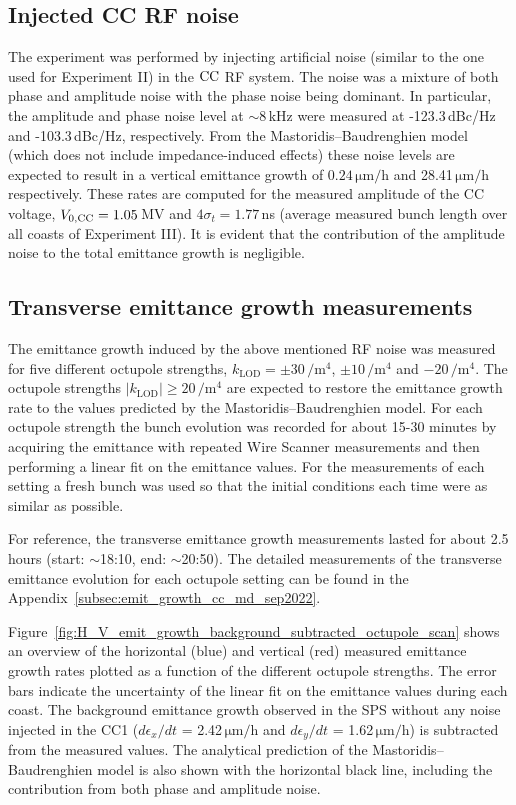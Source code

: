 \subsection{Injected CC RF noise}\label{subsec:cc_rf_noise_exp3}
The experiment was performed by injecting artificial noise (similar to the one used for Experiment II) in the ${\mathrm{CC}}$ RF system. The noise was a mixture of both phase and amplitude noise with the phase noise being dominant. In particular, the amplitude and phase noise level at $\sim$8\,kHz were measured at -123.3\,dBc/Hz and -103.3\,dBc/Hz, respectively. From the Mastoridis--Baudrenghien model (which does not include impedance-induced effects) these noise levels are expected to result in a vertical emittance growth of $0.24$\,$\mathrm{\mu m/h}$ and 28.41\,$\mathrm{\mu m/h}$ respectively. These rates are computed for the measured amplitude of the CC voltage, ${V_\mathrm{0, CC}}=1.05$\,MV and $4\sigma_t=1.77$\,ns (average measured bunch length over all coasts of Experiment III). It is evident that the contribution of the amplitude noise to the total emittance growth is negligible. %


\subsection{Transverse emittance growth measurements}\label{subsec:cc_rf_noise_emit_growth_exp3}
The emittance growth induced by the above mentioned RF noise was measured for five different octupole strengths, $k_\mathrm{LOD}=\pm 30$\,$\mathrm{/m^4}$, $ \pm 10$\,$\mathrm{/m^4}$ and $-20$\,$\mathrm{/m^4}$. The octupole strengths $| k_\mathrm{LOD} | \geq 20$\,$\mathrm{/m^4}$ are expected to restore the emittance growth rate to the values predicted by the Mastoridis--Baudrenghien model. For each octupole strength the bunch evolution was recorded for about 15-30 minutes by acquiring the emittance with repeated Wire Scanner measurements and then performing a linear fit on the emittance values. For the measurements of each setting a fresh bunch was used so that the initial conditions each time were as similar as possible.

For reference, the transverse emittance growth measurements lasted for about 2.5\,hours (start: $\sim$18:10, end: $\sim$20:50). The detailed measurements of the transverse emittance evolution for each octupole setting can be found in the Appendix~\ref{subsec:emit_growth_cc_md_sep2022}. 

Figure~\ref{fig:H_V_emit_growth_background_subtracted_octupole_scan} shows an overview of the horizontal (blue) and vertical (red) measured emittance growth rates plotted as a function of the different octupole strengths. The error bars indicate the uncertainty of the linear fit on the emittance values during each coast. The background emittance growth observed in the SPS without any noise injected in the CC1 ($d\epsilon_x/dt$ = 2.42\,$\mathrm{\mu m/h}$ and $d\epsilon_y/dt$ = 1.62\,$\mathrm{\mu m/h}$) is subtracted from the measured values. The analytical prediction of the Mastoridis--Baudrenghien model is also shown with the horizontal black line, including the contribution from both phase and amplitude noise.

